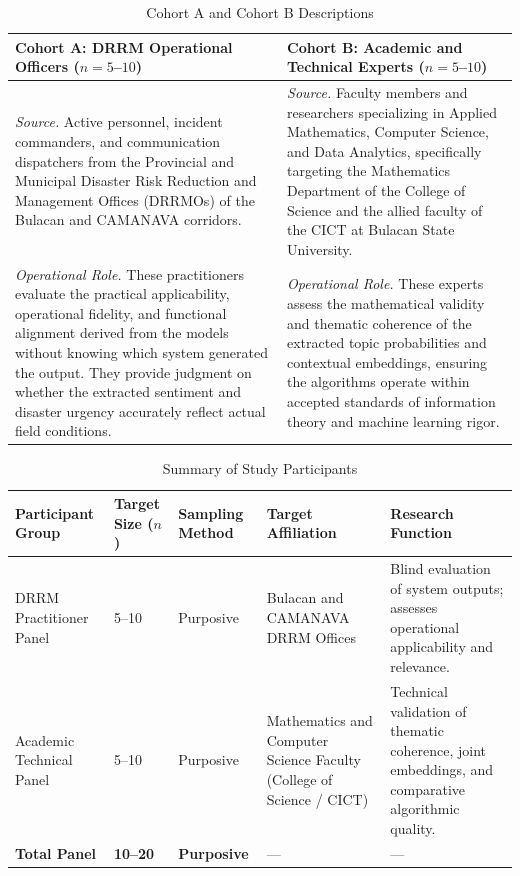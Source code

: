 \documentclass[12pt,a4paper]{report}
\begin{document}
\begin{table}[htbp]
  \centering
  \caption{Cohort A and Cohort B Descriptions}
  \label{tab:cohorts}
  \begin{tabularx}{\textwidth}{XX}
    \toprule
    \textbf{Cohort A: DRRM Operational Officers ($n = 5$--$10$)} &
    \textbf{Cohort B: Academic and Technical Experts ($n = 5$--$10$)} \\
    \midrule
    \textit{Source.} Active personnel, incident commanders, and communication
    dispatchers from the Provincial and Municipal Disaster Risk Reduction and
    Management Offices (DRRMOs) of the Bulacan and CAMANAVA corridors. &
    \textit{Source.} Faculty members and researchers specializing in Applied
    Mathematics, Computer Science, and Data Analytics, specifically targeting
    the Mathematics Department of the College of Science and the allied faculty
    of the CICT at Bulacan State University. \\
    \addlinespace
    \textit{Operational Role.} These practitioners evaluate the practical
    applicability, operational fidelity, and functional alignment derived from
    the models without knowing which system generated the output. They provide
    judgment on whether the extracted sentiment and disaster urgency accurately
    reflect actual field conditions. &
    \textit{Operational Role.} These experts assess the mathematical validity
    and thematic coherence of the extracted topic probabilities and contextual
    embeddings, ensuring the algorithms operate within accepted standards of
    information theory and machine learning rigor. \\
    \bottomrule
  \end{tabularx}
\end{table}

\begin{table}[htbp]
  \centering
  \caption{Summary of Study Participants}
  \label{tab:participants}
  \begin{tabularx}{\textwidth}{XXXXX}
    \toprule
    \textbf{Participant Group} & \textbf{Target Size ($n$)} &
    \textbf{Sampling Method} & \textbf{Target Affiliation} &
    \textbf{Research Function} \\
    \midrule
    DRRM Practitioner Panel & 5--10 & Purposive &
    Bulacan and CAMANAVA DRRM Offices &
    Blind evaluation of system outputs; assesses operational applicability and relevance. \\
    \addlinespace
    Academic Technical Panel & 5--10 & Purposive &
    Mathematics and Computer Science Faculty (College of Science / CICT) &
    Technical validation of thematic coherence, joint embeddings, and
    comparative algorithmic quality. \\
    \addlinespace
    \textbf{Total Panel} & \textbf{10--20} & \textbf{Purposive} & --- & --- \\
    \bottomrule
  \end{tabularx}
\end{table}
\end{document}
